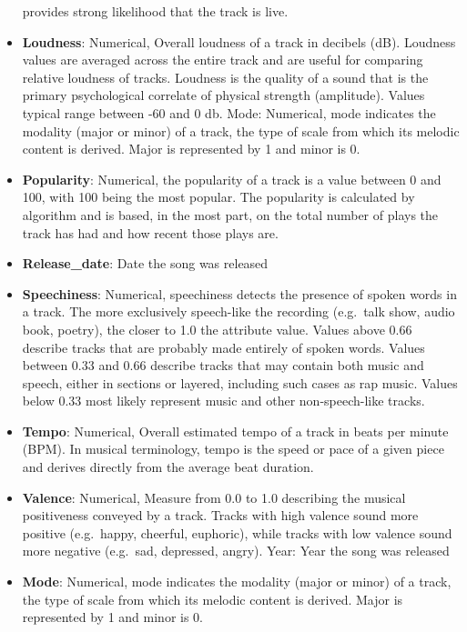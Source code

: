 \documentclass[
]{article}
\begin{document}
\begin{itemize}
  provides strong likelihood that the track is live.
\item
  \textbf{Loudness}: Numerical, Overall loudness of a track in decibels
  (dB). Loudness values are averaged across the entire track and are
  useful for comparing relative loudness of tracks. Loudness is the
  quality of a sound that is the primary psychological correlate of
  physical strength (amplitude). Values typical range between -60 and 0
  db. Mode: Numerical, mode indicates the modality (major or minor) of a
  track, the type of scale from which its melodic content is derived.
  Major is represented by 1 and minor is 0.
\item
  \textbf{Popularity}: Numerical, the popularity of a track is a value
  between 0 and 100, with 100 being the most popular. The popularity is
  calculated by algorithm and is based, in the most part, on the total
  number of plays the track has had and how recent those plays are.
\item
  \textbf{Release\_date}: Date the song was released
\item
  \textbf{Speechiness}: Numerical, speechiness detects the presence of
  spoken words in a track. The more exclusively speech-like the
  recording (e.g.~talk show, audio book, poetry), the closer to 1.0 the
  attribute value. Values above 0.66 describe tracks that are probably
  made entirely of spoken words. Values between 0.33 and 0.66 describe
  tracks that may contain both music and speech, either in sections or
  layered, including such cases as rap music. Values below 0.33 most
  likely represent music and other non-speech-like tracks.
\item
  \textbf{Tempo}: Numerical, Overall estimated tempo of a track in beats
  per minute (BPM). In musical terminology, tempo is the speed or pace
  of a given piece and derives directly from the average beat duration.
\item
  \textbf{Valence}: Numerical, Measure from 0.0 to 1.0 describing the
  musical positiveness conveyed by a track. Tracks with high valence
  sound more positive (e.g.~happy, cheerful, euphoric), while tracks
  with low valence sound more negative (e.g.~sad, depressed, angry).
  Year: Year the song was released
\item
  \textbf{Mode}: Numerical, mode indicates the modality (major or minor)
  of a track, the type of scale from which its melodic content is
  derived. Major is represented by 1 and minor is 0.
\end{itemize}
\end{document}
